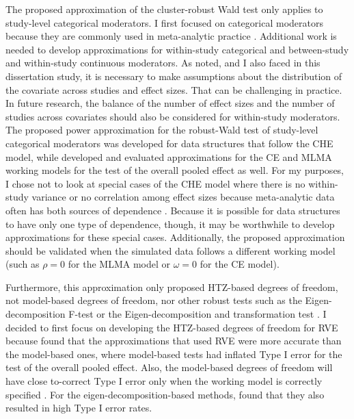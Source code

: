 The proposed approximation of the cluster-robust Wald test only applies to study-level categorical moderators. I first focused on categorical moderators because they are commonly used in meta-analytic practice \autocite{ahn2012, tipton2019}. 
Additional work is needed to develop approximations for within-study categorical and between-study and within-study continuous moderators. As \textcite{vembye2023} noted, and I also faced in this dissertation study, it is necessary to make assumptions about the distribution of the covariate across studies and effect sizes. That can be challenging in practice. In future research, the balance of the number of effect sizes and the number of studies across covariates should also be considered for within-study moderators.  
The proposed power approximation for the robust-Wald test of study-level categorical moderators was developed for data structures that follow the CHE model, while \textcite{vembye2023} developed and evaluated approximations for the CE and MLMA working models for the test of the overall pooled effect as well. For my purposes, I chose not to look at special cases of the CHE model where there is no within-study variance or no correlation among effect sizes because meta-analytic data often has both sources of dependence \autocite{pustejovsky2022}. Because it is possible for data structures to have only one type of dependence, though, it may be worthwhile to develop approximations for these special cases. Additionally, the proposed approximation should be validated when the simulated data follows a different working model (such as $\rho=0$ for the MLMA model or $\omega=0$ for the CE model).

Furthermore, this approximation only proposed HTZ-based degrees of freedom, not model-based degrees of freedom, nor other robust tests such as the Eigen-decomposition F-test or the Eigen-decomposition and transformation test \autocite{tipton2015b}. I decided to first focus on developing the HTZ-based degrees of freedom for RVE because \textcite{vembye2023} found that the approximations that used RVE were more accurate than the model-based ones, where model-based tests had inflated Type I error for the test of the overall pooled effect. Also, the model-based degrees of freedom will have close to-correct Type I error only when the working model is correctly specified \autocite{vembye2023}. For the eigen-decomposition-based methods, \textcite{tipton2015b} found that they also resulted in high Type I error rates. 


